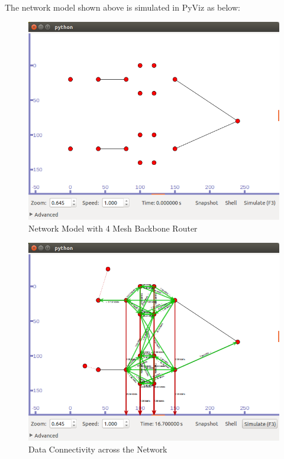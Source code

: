 \documentclass[12pt,a4paper]{report}
\begin{document}
The network model shown above is simulated in PyViz as below:
\begin{figure}[hbtp]
\centering
\includegraphics[scale=.4]{mesh-2x2.png}
\caption{Network Model with 4 Mesh Backbone Router}
\end{figure}


\begin{figure}[hbtp]
\centering
\includegraphics[scale=.45]{mesh-2x2-working.png}
\caption{Data Connectivity across the Network}
\end{figure}
\end{document}
